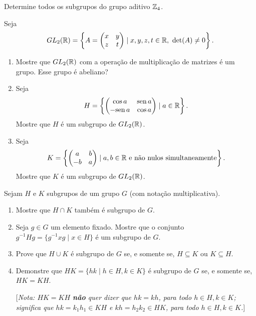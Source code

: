 \documentclass[12pt]{exam}
\begin{document}
    \vspace{.3cm}

    \questao{} Determine todos os subgrupos do grupo aditivo $\mathbb{Z}_4$.

    \vspace{.3cm}

    \questao{} Seja
    \[
      GL_2(\mathbb{R}) = \left\{ A = \begin{pmatrix}
          x & y\\z & t
      \end{pmatrix} \mid x, y, z, t \in \mathbb{R},\ \det(A) \ne 0\right\}.
    \]
    \begin{enumerate}[label=({\alph*})]
      \item Mostre que $GL_2(\mathbb{R})$ com a opera\c{c}\~ao de multiplica\c{c}\~ao de matrizes \'e um grupo. Esse grupo \'e abeliano?

      \item Seja
      \[
          H = \left\{ \begin{pmatrix}
              \cos a & {\rm sen\,} a\\ - {\rm sen\,} a & \cos a
          \end{pmatrix} \mid a \in \mathbb{R}\right\}.
      \]
      Mostre que $H$ \'e um subgrupo de $GL_2(\mathbb{R})$.

      \item Seja
      \[
          K = \left\{ \begin{pmatrix}
              a & b\\ -b & a
          \end{pmatrix} \mid a, b \in \mathbb{R} \mbox{ e n\~ao nulos simultaneamente}\right\}.
      \]
      Mostre que $K$ \'e um subgrupo de $GL_2(\mathbb{R})$.
    \end{enumerate}

    \questao{} Sejam $H$ e $K$ subgrupos de um grupo $G$ (com nota{\c c}{\~a}o
    multiplicativa).
    \begin{enumerate}[label=({\alph*})]
      \item Mostre que $H\cap K$ tamb{\'e}m {\'e} subgrupo de $G$.

      \item Seja $g\in G$ um elemento fixado. Mostre que o conjunto
      $g^{-1}Hg=\{ g^{-1}xg \mid x\in H \} $ {\'e} um subgrupo de $G$.

      \item Prove que $H\cup K$ {\'e} subgrupo de $G$ se, e somente se,
      $H\subseteq K$ ou $K\subseteq H$.

      \item Demonstre que $HK=\{hk \mid h\in H, k\in K\}$ {\'e} subgrupo
      de $G$ se, e somente se, $HK=KH$.

      [\emph{Nota: $HK=KH$ \textbf{n{\~a}o} quer dizer que $hk=kh$,
      para todo $h\in H, k\in K$; significa que $hk=k_1h_1 \in KH$ e $kh=h_2k_2 \in
      HK$, para todo $h\in H, k\in K$.}]
    \end{enumerate}
\end{document}
